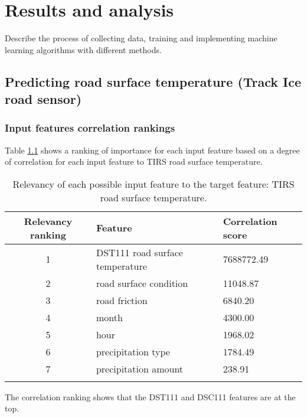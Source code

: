 \chapter{Results and analysis}
Describe the process of collecting data, training and implementing machine learning algorithms with different methods.


	
\section{Predicting road surface temperature (Track Ice road sensor)}
	\subsection{Input features correlation rankings}
	Table \ref{table:feature_comparison_tirs} shows a ranking of importance for each input feature based on a degree of correlation for each input feature to TIRS road surface temperature.

	\begin{table}[H]
		\centering
		\caption{Relevancy of each possible input feature to the target feature: TIRS road surface temperature. }
		\begin{tabular}[3]{c | l | l }
    			Relevancy ranking & Feature & Correlation score  \\
			 \hline
			1 & DST111 road surface temperature & 7688772.49 \\
			2 & road surface condition & 11048.87 \\
			3 & road friction & 6840.20 \\
			4 & month & 4300.00 \\
			5 & hour & 1968.02 \\
			6 & precipitation type & 1784.49 \\
			7 & precipitation amount & 238.91 \\
 
			\label{table:feature_comparison_tirs}
		\end{tabular}
	\end{table}

	The correlation ranking shows that the DST111 and DSC111 features are at the top.

